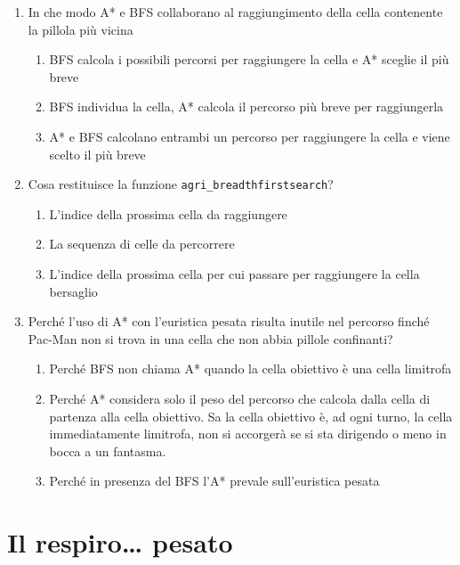 \documentclass[8pt]{book}
\begin{document}
\begin{enumerate}
  \item
In che modo A* e BFS collaborano al raggiungimento della cella contenente la pillola più vicina

\begin{enumerate}
\def\labelenumi{\alph{enumi}.}

\item
  BFS calcola i possibili percorsi per raggiungere la cella e A* sceglie il più breve
\item
  BFS individua la cella, A* calcola il percorso più breve per raggiungerla
\item
  A* e BFS calcolano entrambi un percorso per raggiungere la cella e viene scelto il più breve
\end{enumerate}

\item
Cosa restituisce la funzione \texttt{agri\_breadthfirstsearch}?

\begin{enumerate}
\def\labelenumi{\alph{enumi}.}

\item
  L'indice della prossima cella da raggiungere
\item
  La sequenza di celle da percorrere
\item
  L'indice della prossima cella per cui passare per raggiungere la cella bersaglio
\end{enumerate}

\item
Perché l'uso di A* con l'euristica pesata risulta inutile nel percorso finché Pac-Man non si trova in una cella che non abbia pillole confinanti?

\begin{enumerate}
\def\labelenumi{\alph{enumi}.}

\item
  Perché BFS non chiama A* quando la cella obiettivo è una cella limitrofa
\item
  Perché A* considera solo il peso del percorso che calcola dalla cella di partenza alla cella obiettivo. Sa la cella obiettivo è, ad ogni turno, la cella immediatamente limitrofa, non si accorgerà se si sta dirigendo o meno in bocca a un fantasma.
\item
  Perché in presenza del BFS l'A* prevale sull'euristica pesata
\end{enumerate}
\end{enumerate}


\chapter{Il respiro\ldots{} pesato}
\end{document}
